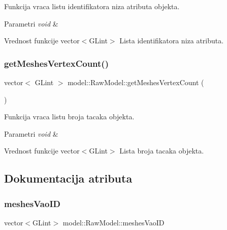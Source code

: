 Funkcija vraca listu identifikatora niza atributa objekta. 


\begin{DoxyParams}{Parametri}
{\em void} & \\
\hline
\end{DoxyParams}
\begin{DoxyReturn}{Vrednost funkcije}
vector$<$\+G\+Lint$>$ Lista identifikatora niza atributa. 
\end{DoxyReturn}
\mbox{\label{classmodel_1_1RawModel_aafc5e5b7da34dda1c80cff89a65d08e5}} 
\subsubsection{\texorpdfstring{get\+Meshes\+Vertex\+Count()}{getMeshesVertexCount()}}
{\footnotesize\ttfamily vector$<$ G\+Lint $>$ model\+::\+Raw\+Model\+::get\+Meshes\+Vertex\+Count (\begin{DoxyParamCaption}\item[{void}]{ }\end{DoxyParamCaption})}



Funkcija vraca listu broja tacaka objekta. 


\begin{DoxyParams}{Parametri}
{\em void} & \\
\hline
\end{DoxyParams}
\begin{DoxyReturn}{Vrednost funkcije}
vector$<$\+G\+Lint$>$ Lista broja tacaka objekta. 
\end{DoxyReturn}


\subsection{Dokumentacija atributa}
\mbox{\label{classmodel_1_1RawModel_a994176411e71716620d422dd56febbac}} 
\subsubsection{\texorpdfstring{meshes\+Vao\+ID}{meshesVaoID}}
{\footnotesize\ttfamily vector$<$G\+Lint$>$ model\+::\+Raw\+Model\+::meshes\+Vao\+ID\hspace{0.3cm}{\ttfamily [private]}}



